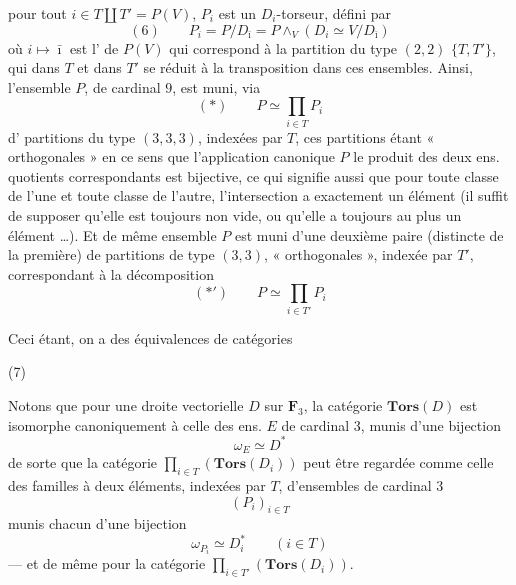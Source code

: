 \documentclass[11pt,a4paper]{article}
\begin{document}
 pour tout $i \in T \amalg T' = P(V)$, $P_i$ est un
$D_i$-torseur, défini par
\[
  (6) \qquad P_i = P / D_{\bar\imath} = P \wedge_V (D_i \simeq V / D_{\bar\imath})
\]
où $i \mapsto \bar\imath$ est l'  de $P(V)$ qui
 correspond à la partition du type $(2,2)$ $\{T, T'\}$, qui dans $T$
et dans $T'$ se réduit à la transposition dans ces ensembles. Ainsi,
l'ensemble $P$, de cardinal $9$, est muni, via
\[
  (\ast) \qquad P \simeq \prod_{i \in T} P_i
\]
d'  partitions du type $(3,3,3)$, indexées par
$T$, ces partitions étant « orthogonales » en ce sens que l'application
canonique  $P$  le produit des deux ens. quotients
correspondants est bijective, ce qui signifie aussi que pour toute classe de
l'une et toute classe de l'autre, l'intersection a exactement un élément (il
suffit de supposer qu'elle est toujours non vide, ou qu'elle a toujours au
plus un élément \ldots). Et de même ensemble $P$ est muni d'une deuxième paire
(distincte de la première) de partitions de type $(3,3)$, « orthogonales », indexée par $T'$,
correspondant à la décomposition
\[
  (\ast') \qquad P \simeq \prod_{i \in T'} P_i
\]


Ceci étant, on a des équivalences de catégories


(7)

Notons que pour une droite vectorielle $D$ sur $\mathbf{F}_3$, la catégorie
$\mathbf{Tors}(D)$ est isomorphe canoniquement à celle des ens. $E$ de cardinal
$3$, munis d'une bijection
\[
  \omega_E \simeq D^{*}
\]
de sorte que la catégorie $\prod_{i \in T} (\mathbf{Tors}(D_i))$ peut être
regardée comme celle des familles à deux éléments, indexées par $T$,
d'ensembles de cardinal $3$
\[
  (P_i)_{i \in T}
\]
munis chacun d'une bijection
\[
  \omega_{P_i} \simeq D_i^{*} \qquad (i \in T)
\]
--- et de même pour la catégorie $\prod_{i \in T'} (\mathbf{Tors}(D_i))$.
\end{document}

